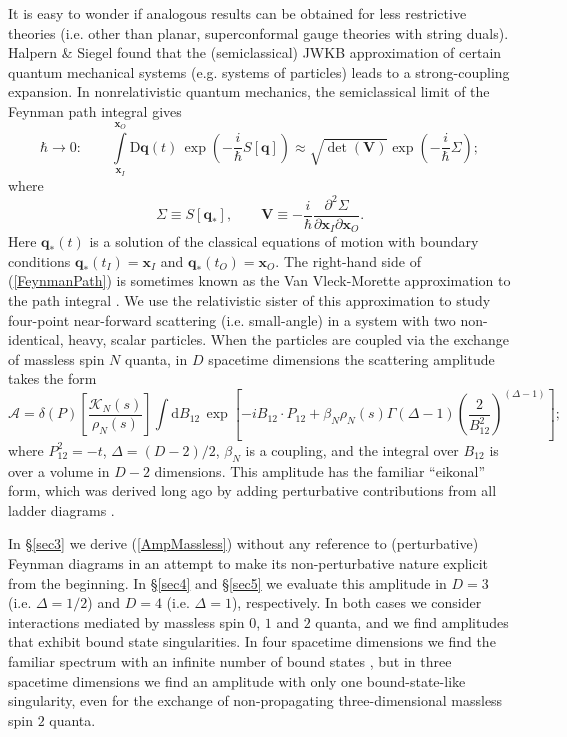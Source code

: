 It is easy to wonder if analogous results can be obtained for less restrictive theories (i.e. other than planar, superconformal gauge theories with string duals). Halpern \& Siegel \cite{HalpernSiegel} found that the (semiclassical) JWKB approximation of certain quantum mechanical systems (e.g. systems of particles) leads to a strong-coupling expansion. In nonrelativistic quantum mechanics, the semiclassical limit of the Feynman path integral gives
\begin{equation}
	\hbar \rightarrow 0: \qquad \int\limits_{\mathbf{x}_{I}}^{\mathbf{x}_{O}} \mathrm{D}\mathbf{q}(t) \, \exp{\left( - \frac{i}{\hbar} S[\mathbf{q}] \right)} \approx \sqrt{\det{(\mathbf{V})}} \exp{\left( - \frac{i}{\hbar} \Sigma \right)};
	\label{FeynmanPath}
\end{equation}
where
\begin{equation}
	\Sigma \equiv S[\mathbf{q}_{*}], \qquad \mathbf{V} \equiv - \frac{i}{\hbar} \frac{\partial^{2} \Sigma}{\partial \mathbf{x}_{I} \partial \mathbf{x}_{O}}.
\end{equation}
Here $\mathbf{q}_{*}(t)$ is a solution of the classical equations of motion with boundary conditions $\mathbf{q}_{*}(t_{I}) = \mathbf{x}_{I}$ and $\mathbf{q}_{*}(t_{O}) = \mathbf{x}_{O}$. The right-hand side of (\ref{FeynmanPath}) is sometimes known as the Van Vleck-Morette approximation to the path integral \cite{VanVleck,CartierMorette}. We use the relativistic sister of this approximation to study four-point near-forward scattering (i.e. small-angle) in a system with two non-identical, heavy, scalar particles. When the particles are coupled via the exchange of massless spin $N$ quanta, in $D$ spacetime dimensions the scattering amplitude takes the form
\begin{equation}
	\mathcal{A} = \delta(P) \left[ \frac{\mathcal{K}_{N}(s)}{\rho_{N}(s)} \right] \int \mathrm{d}B_{12} \, \exp{\left[ - i B_{12} \cdot P_{12} + \beta_{N} \rho_{N}(s) \Gamma(\Delta - 1) \left( \frac{2}{B_{12}^{2}} \right)^{(\Delta - 1)} \right]};
	\label{AmpMassless}
\end{equation}
where $P_{12}^{2} = -t$, $\Delta = (D - 2)/2$, $\beta_{N}$ is a coupling, and the integral over $B_{12}$ is over a volume in $D - 2$ dimensions. This amplitude has the familiar ``eikonal'' form, which was derived long ago by adding perturbative contributions from all ladder diagrams \cite{ChengWuPRL,AbarbItzyk,LevySucher1,ChangMa}.

In \S\ref{sec3} we derive (\ref{AmpMassless}) without any reference to (perturbative) Feynman diagrams in an attempt to make its non-perturbative nature explicit from the beginning. In \S\ref{sec4} and \S\ref{sec5} we evaluate this amplitude in $D = 3$ (i.e. $\Delta = 1/2$) and $D = 4$ (i.e. $\Delta = 1$), respectively. In both cases we consider interactions mediated by massless spin $0$, $1$ and $2$ quanta, and we find amplitudes that exhibit bound state singularities. In four spacetime dimensions we find the familiar spectrum with an infinite number of bound states \cite{BIZJ,KabatOrtiz,Dittrich}, but in three spacetime dimensions we find an amplitude with only one bound-state-like singularity, even for the exchange of non-propagating three-dimensional massless spin $2$ quanta.

